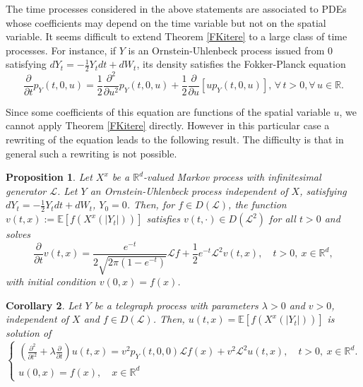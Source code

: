 \documentclass[a4paper, 11pt]{article}
\newtheorem{prop}{Proposition}
\newtheorem{corol}[prop]{Corollary}
\newcommand{\R}{\mathbb{R}}
\newcommand{\E}{\mathbb{E}}
\newcommand{\1}{\mathbf{1}}
\begin{document}
\noindent The time processes considered in the above statements are associated to PDEs whose coefficients may depend on the time variable but not on the spatial variable. It seems difficult to extend Theorem \ref{FKitere} to a large class of time processes. For instance, if $Y$ is an Ornstein-Uhlenbeck process issued from $0$ satisfying $dY_t=-\frac{1}{2}Y_tdt+dW_t$, its density satisfies the Fokker-Planck equation 
\begin{equation}
\label{FPOU}
\frac{\partial}{\partial t}p_Y(t,0,u)=\frac{1}{2}\frac{\partial^2}{\partial u^2}p_Y(t,0,u)+\frac{1}{2}\frac{\partial}{\partial u}\left[up_Y(t,0,u)\right], \,  \forall\,  t>0, \forall\,  u\in \R.
\end{equation}

\noindent Since some coefficients of this equation are functions of the spatial variable $u$, we cannot apply Theorem \ref{FKitere} directly. However in this particular case a rewriting of the equation leads to the following result. The difficulty is that in general such a rewriting is not possible.



\begin{prop}\label{OU}
Let $X^x$ be a $\R^d$-valued Markov process with infinitesimal generator $\mathcal{L}$. Let $Y$ an Ornstein-Uhlenbeck process independent of $X$, satisfying $dY_t=-\frac{1}{2}Y_tdt+dW_t$, $Y_0=0$. Then, for $f\in D(\mathcal{L})$, the function $v(t,x):=\E \left[f(X^x(|Y_t|))\right]$ satisfies $v(t,\cdot)\in D(\mathcal{L}^2)$ for all $t>0$ and solves
\begin{equation}
\label{eq:46}
\frac{\partial}{\partial t}v(t,x)=\frac{e^{-t}}{2\sqrt{2\pi(1-e^{-t})}}\mathcal{L}f+\frac{1}{2}e^{-t}\mathcal{L}^2v(t,x), \quad t>0,\ x\in\R^d,
\end{equation}
with initial condition $v(0,x)=f(x)$.
\end{prop}


\begin{corol}
Let $Y$ be a telegraph process with parameters $\lambda>0$ and $v>0$, independent of $X$ and $f\in D(\mathcal{L})$. Then, $u(t,x)=\E \left[f(X^x(|Y_t|))\right]$ is solution of
\begin{equation*}
\begin{cases} 
\left(\frac{\partial^2}{\partial t^2}+\lambda\frac{\partial}{\partial t}\right)u(t,x)=v^2p_Y(t,0,0)\mathcal{L}f(x)+v^2\mathcal{L}^2u(t,x), \quad t>0,\ x\in\R^d.\\
u(0,x)=f(x), \quad x\in\R^d
\end{cases}
\end{equation*}
\end{corol}
\end{document}
